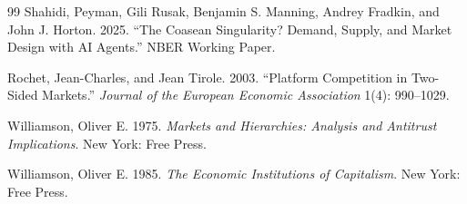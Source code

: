 \documentclass[12pt]{article}
\theoremstyle{definition}
\begin{document}
\begin{thebibliography}{99}
Shahidi, Peyman, Gili Rusak, Benjamin S. Manning, Andrey Fradkin, and John J. Horton. 2025. ``The Coasean Singularity? Demand, Supply, and Market Design with AI Agents.'' NBER Working Paper.

Rochet, Jean-Charles, and Jean Tirole. 2003. ``Platform Competition in Two-Sided Markets.'' \textit{Journal of the European Economic Association} 1(4): 990--1029.

Williamson, Oliver E. 1975. \textit{Markets and Hierarchies: Analysis and Antitrust Implications}. New York: Free Press.

Williamson, Oliver E. 1985. \textit{The Economic Institutions of Capitalism}. New York: Free Press.

\end{thebibliography}
\end{document}
